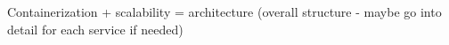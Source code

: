 Containerization + scalability = architecture (overall structure - maybe go into detail for each service if needed)